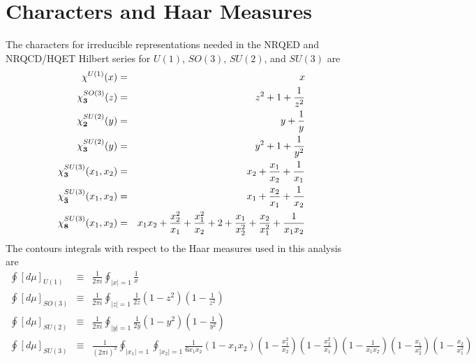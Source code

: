 \documentclass[prd,onecolumn, nofootinbib, 11pt]{revtex4}
\begin{document}
\appendix


\section{Characters and Haar Measures}
\label{Haars}

The characters for irreducible representations needed in the NRQED and NRQCD/HQET Hilbert series for $U(1)$, $SO(3)$, $SU(2)$, and $SU(3)$ are
%
\begin{eqnarray}
\chi^{U(1)}(x) &=& x \\
\chi_{\bf 3}^{SO(3)}(z) &=& z^2 + 1 + \frac{1}{z^2} \\
\chi_{\bf 2}^{SU(2)}(y) &=& y + \frac{1}{y} \\
\chi_{\bf 3}^{SU(2)}(y) &=& y^2 + 1 + \frac{1}{y^2} \\
\chi_{\bf 3}^{SU(3)}(x_1, x_2) &=& x_2 + \frac{x_1}{x_2} + \frac{1}{x_1} \\
\chi_{\bf \bar{3}}^{SU(3)}(x_1, x_2) &=& x_1 + \frac{x_2}{x_1} + \frac{1}{x_2} \\
\chi_{\bf 8}^{SU(3)}(x_1, x_2) &=& x_1x_2 + \frac{x_2^2}{x_1} + \frac{x_1^2}{x_2} + 2 + \frac{x_1}{x_2^2} + \frac{x_2}{x_1^2} + \frac{1}{x_1x_2} 
\end{eqnarray} 
%
The contours integrals with respect to the Haar measures used in this analysis are
%
\begin{eqnarray}
\displaystyle \oint [d\mu]_{U(1)} &\equiv& \frac{1}{2\pi i} \oint_{|x|=1} \frac{1}{x}\\
\displaystyle \oint [d\mu]_{SO(3)} &\equiv& \frac{1}{2\pi i} \oint_{|z|=1} \frac{1}{2z} (1-z^2)\left(1-\frac{1}{z^2}\right) \\
\displaystyle \oint [d\mu]_{SU(2)} &\equiv& \frac{1}{2\pi i} \oint_{|y|=1}  \frac{1}{2y} (1-y^2)\left(1-\frac{1}{y^2}\right) \\
\displaystyle \oint [d\mu]_{SU(3)} &\equiv& \frac{1}{(2\pi i)^2} \oint_{|x_1|=1} \oint_{|x_2|=1} \frac{1}{6x_1x_2}(1-x_1x_2)\left(1-\frac{x_1^2}{x_2} \right)\left(1-\frac{x_2^2}{x_1} \right)\left(1-\frac{1}{x_1x_2} \right)\left(1-\frac{x_1}{x_2^2} \right)\left(1-\frac{x_2}{x_1^2} \right) \nonumber \\
\end{eqnarray}














{}
\end{document}
